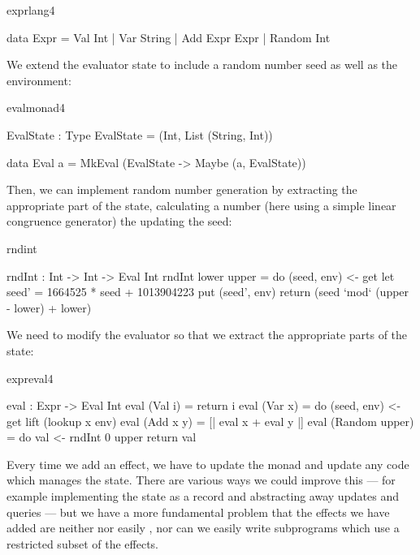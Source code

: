 \begin{SaveVerbatim}{exprlang4}

data Expr = Val Int
          | Var String
          | Add Expr Expr
          | Random Int

\end{SaveVerbatim}

We extend the evaluator state to include a random number seed as well as
the environment:

\begin{SaveVerbatim}{evalmonad4}

EvalState : Type
EvalState = (Int, List (String, Int))
  
data Eval a = MkEval (EvalState -> Maybe (a, EvalState))

\end{SaveVerbatim}

Then, we can implement random number generation by extracting the appropriate
part of the state, calculating a number (here using a simple linear congruence
generator) the updating the seed:

\begin{SaveVerbatim}{rndint}

rndInt : Int -> Int -> Eval Int
rndInt lower upper 
    = do (seed, env) <- get
         let seed' = 1664525 * seed + 1013904223
         put (seed', env)
         return (seed `mod` (upper - lower) + lower)

\end{SaveVerbatim}

We need to modify the evaluator so that we extract the appropriate parts
of the state:

\begin{SaveVerbatim}{expreval4}

eval : Expr -> Eval Int
eval (Val i) = return i
eval (Var x) = do (seed, env) <- get
                  lift (lookup x env)
eval (Add x y) = [| eval x + eval y |]
eval (Random upper) = do val <- rndInt 0 upper
                         return val

\end{SaveVerbatim}

Every time we add an effect, we have to update the monad and update any
code which manages the state. There are various ways we could improve this
--- for example implementing the state as a record and abstracting away
updates and queries --- but we have a more fundamental problem that the
effects we have added are neither  nor easily
, nor can we easily write subprograms which use a 
restricted subset of the effects.

